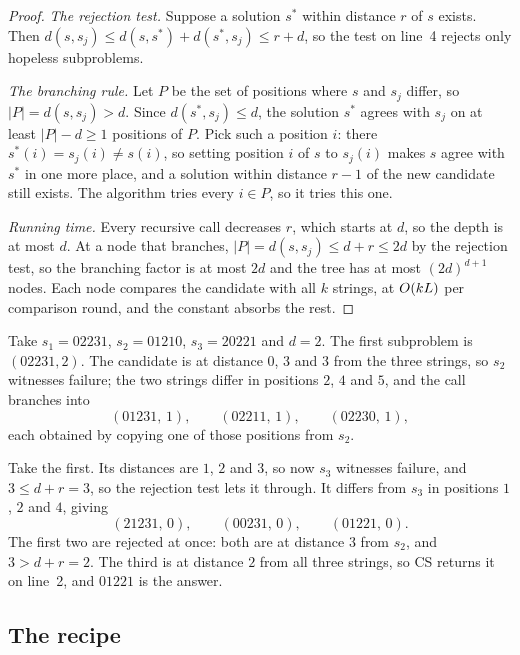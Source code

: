 \begin{proof}
\emph{The rejection test.} Suppose a solution $s^{*}$ within distance $r$ of $s$
exists. Then $d(s,s_j) \le d(s,s^{*}) + d(s^{*},s_j) \le r + d$, so the test on
line~4 rejects only hopeless subproblems.

\emph{The branching rule.} Let $P$ be the set of positions where $s$ and $s_j$
differ, so $|P| = d(s,s_j) > d$. Since $d(s^{*},s_j) \le d$, the solution
$s^{*}$ agrees with $s_j$ on at least $|P| - d \ge 1$ positions of $P$. Pick
such a position $i$: there $s^{*}(i) = s_j(i) \ne s(i)$, so setting position $i$
of $s$ to $s_j(i)$ makes $s$ agree with $s^{*}$ in one more place, and a
solution within distance $r-1$ of the new candidate still exists. The algorithm
tries every $i \in P$, so it tries this one.

\emph{Running time.} Every recursive call decreases $r$, which starts at $d$, so
the depth is at most $d$. At a node that branches, $|P| = d(s,s_j) \le d+r \le
2d$ by the rejection test, so the branching factor is at most $2d$ and the tree
has at most $(2d)^{d+1}$ nodes. Each node compares the candidate with all $k$
strings, at $O\!\left(kL\right)$ per comparison round, and the constant absorbs the
rest.
\end{proof}

\begin{example}\label{ex:closest-string}
Take $s_1 = 02231$, $s_2 = 01210$, $s_3 = 20221$ and $d = 2$. The first
subproblem is $(02231, 2)$. The candidate is at distance $0$, $3$ and $3$ from
the three strings, so $s_2$ witnesses failure; the two strings differ in
positions $2$, $4$ and $5$, and the call branches into
\[ (01231,\,1), \qquad (02211,\,1), \qquad (02230,\,1), \]
each obtained by copying one of those positions from $s_2$.

Take the first. Its distances are $1$, $2$ and $3$, so now $s_3$ witnesses
failure, and $3 \le d + r = 3$, so the rejection test lets it through. It
differs from $s_3$ in positions $1$, $2$ and $4$, giving
\[ (21231,\,0), \qquad (00231,\,0), \qquad (01221,\,0). \]
The first two are rejected at once: both are at distance $3$ from $s_2$, and
$3 > d + r = 2$. The third is at distance $2$ from all three strings, so
\textsc{CS} returns it on line~2, and $01221$ is the answer.
\end{example}

\subsection{The recipe}
\label{sec:fpt-branching-recipe}

